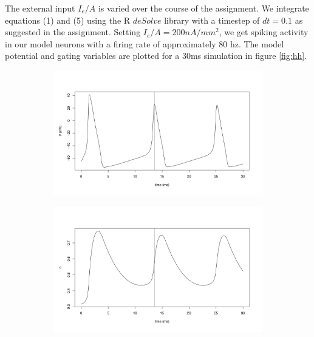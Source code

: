 \documentclass{article}
\begin{document}
The external input $I_e/A$ is varied over the course of the assignment. We integrate equations (1) and (5) using the R $deSolve$ library with a timestep of $dt=0.1$ as suggested in the assignment. Setting $I_e/A = 200 nA/mm^2$, we get spiking activity in our model neurons with a firing rate of approximately 80 hz. The model potential and gating variables are plotted for a 30ms simulation in figure \ref{fig:hh}.



\begin{figure}[h]
	\centering
	\begin{subfigure}[t]{0.45\linewidth}
		\centering
		\includegraphics[width = 1.0\linewidth, trim={20 60 40 70}, clip=true]{hh_V.png}
		\label{fig:hhV}	
	\end{subfigure}%
	\hspace{0.05\linewidth}
	\begin{subfigure}[t]{0.45\linewidth}
		\centering
		\includegraphics[width = 1.0\linewidth, trim={20 60 40 70}, clip=true]{hh_n.png}

\end{subfigure}
\end{figure}
\end{document}

